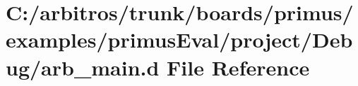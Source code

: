 \hypertarget{boards_2primus_2examples_2primus_eval_2project_2_debug_2arb__main_8d}{\section{C\-:/arbitros/trunk/boards/primus/examples/primus\-Eval/project/\-Debug/arb\-\_\-main.d File Reference}
\label{boards_2primus_2examples_2primus_eval_2project_2_debug_2arb__main_8d}
}

